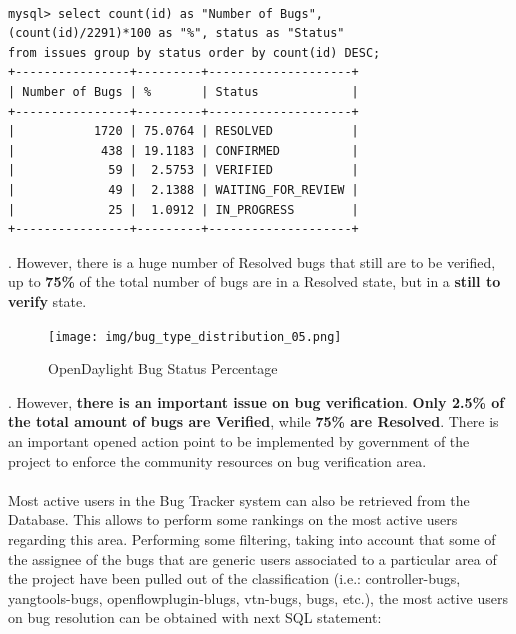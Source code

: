\documentclass[a4paper, 12pt]{book}
\begin{document}
{\begin{verbatim}

mysql> select count(id) as "Number of Bugs",
(count(id)/2291)*100 as "%", status as "Status"
from issues group by status order by count(id) DESC;
+----------------+---------+--------------------+
| Number of Bugs | %       | Status             |
+----------------+---------+--------------------+
|           1720 | 75.0764 | RESOLVED           |
|            438 | 19.1183 | CONFIRMED          |
|             59 |  2.5753 | VERIFIED           |
|             49 |  2.1388 | WAITING_FOR_REVIEW |
|             25 |  1.0912 | IN_PROGRESS        |
+----------------+---------+--------------------+

\end{verbatim}
. However, there is a huge number of Resolved bugs that still are to be verified, up to \textbf{75\%} of the total number of bugs are in a Resolved state, but in a \textbf{still to verify} state.
\begin{center}
 \begin{figure}[H]
 \begin{center}
   \texttt{[image: img/bug\_type\_distribution\_05.png]}
   \caption{OpenDaylight Bug Status Percentage}
   \label{fig:odl_bug_type_distribution}
 \end{center}
 \end{figure}
\end{center}
. However, \textbf{there is an important issue on bug verification}. \textbf{Only 2.5\% of the total amount of bugs are Verified}, while \textbf{75\% are Resolved}. There is an important opened action point to be implemented by government of the project to enforce the community resources on bug verification area.\\
\\
Most active users in the Bug Tracker system can also be retrieved from the Database. This allows to perform some rankings on the most active users regarding this area. Performing some filtering, taking into account that some of the assignee of the bugs that are generic users associated to a particular area of the project have been pulled out of the classification (i.e.: controller-bugs, yangtools-bugs, openflowplugin-blugs, vtn-bugs, bugs, etc.), the most active users on bug resolution can be obtained with next SQL statement:

}
\end{document}
